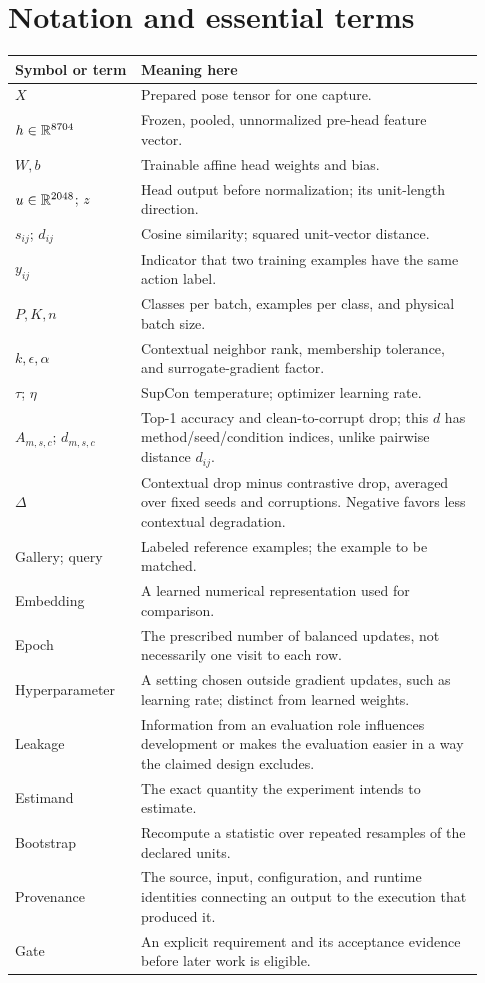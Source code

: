 \section{Notation and essential terms}
\begin{longtable}{@{}P{0.25\linewidth}P{0.68\linewidth}@{}}
\toprule Symbol or term & Meaning here\\\midrule\endhead
$X$ & Prepared pose tensor for one capture.\\
$h\in\mathbb{R}^{8704}$ & Frozen, pooled, unnormalized pre-head feature vector.\\
$W,b$ & Trainable affine head weights and bias.\\
$u\in\mathbb{R}^{2048}$; $z$ & Head output before normalization; its unit-length direction.\\
$s_{ij}$; $d_{ij}$ & Cosine similarity; squared unit-vector distance.\\
$y_{ij}$ & Indicator that two training examples have the same action label.\\
$P,K,n$ & Classes per batch, examples per class, and physical batch size.\\
$k,\epsilon,\alpha$ & Contextual neighbor rank, membership tolerance, and
surrogate-gradient factor.\\
$\tau$; $\eta$ & SupCon temperature; optimizer learning rate.\\
$A_{m,s,c}$; $d_{m,s,c}$ & Top-1 accuracy and clean-to-corrupt drop; this $d$ has
method/seed/condition indices, unlike pairwise distance $d_{ij}$.\\
$\Delta$ & Contextual drop minus contrastive drop, averaged over fixed seeds
and corruptions. Negative favors less contextual degradation.\\
Gallery; query & Labeled reference examples; the example to be matched.\\
Embedding & A learned numerical representation used for comparison.\\
Epoch & The prescribed number of balanced updates, not necessarily one visit
to each row.\\
Hyperparameter & A setting chosen outside gradient updates, such as learning
rate; distinct from learned weights.\\
Leakage & Information from an evaluation role influences development or makes
the evaluation easier in a way the claimed design excludes.\\
Estimand & The exact quantity the experiment intends to estimate.\\
Bootstrap & Recompute a statistic over repeated resamples of the declared units.\\
Provenance & The source, input, configuration, and runtime identities connecting
an output to the execution that produced it.\\
Gate & An explicit requirement and its acceptance evidence before later work
is eligible.\\\bottomrule
\end{longtable}

